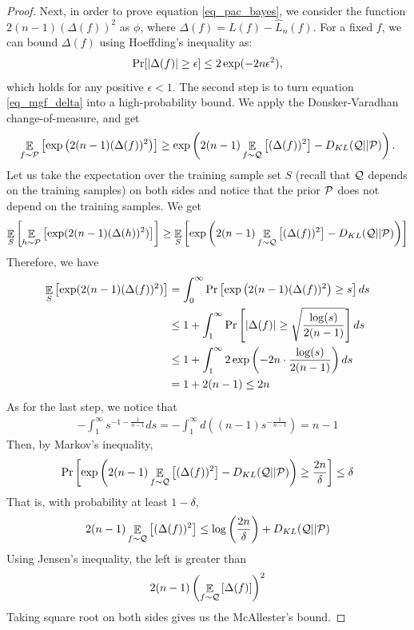 \begin{proof}
Next, in order to prove equation \eqref{eq_pac_bayes}, we consider the function $2(n-1) (\Delta(f))^2$ as $\phi$, where $\Delta(f) = L(f) - \hat L_n(f)$.
For a fixed $f$, we can bound $\Delta(f)$ using Hoeffding's inequality as:
\begin{align}
    \Pr[\left\lvert\Delta(f)\right\rvert \ge \epsilon] \le 2\exp(-2n \epsilon^2), \label{eq_mgf_delta}
\end{align}
which holds for any positive $\epsilon < 1$.
The second step is to turn equation \eqref{eq_mgf_delta} into a high-probability bound.
We apply the Donsker-Varadhan change-of-measure, and get
\begin{align*}
    \mathop{\mathbb{E}}_{f\sim\mathcal{P}}\left[ \exp\left(2(n-1) (\Delta(f))^2\right) \right]
    \ge \exp\left( 2(n-1) \mathop{\mathbb{E}}_{f\sim\mathcal{Q}}\left[ (\Delta(f))^2 \right] - D_{KL}(\mathcal{Q} || \mathcal{P})\right).
\end{align*}
Let us take the expectation over the training sample set $S$ (recall that $\mathcal{Q}$ depends on the training samples) on both sides and notice that the prior $\mathcal{P}$ does not depend on the training samples.
We get
\begin{align*}
    \mathop{\mathbb{E}}_{S}\left[ \mathop{\mathbb{E}}_{h\sim\mathcal{P}}\left[ \exp(2(n-1) (\Delta(h))^2) \right] \right]
    \ge \mathop{\mathbb{E}}_{S}\left[ \exp\left( 2(n-1) \mathop{\mathbb{E}}_{f\sim\mathcal{Q}}\left[ (\Delta(f))^2 \right] - D_{KL}(\mathcal{Q} || \mathcal{P})\right) \right]
\end{align*}
Therefore, we have
\begin{align*}
    \mathop{\mathbb{E}}_{S}\left[ \exp(2(n-1) (\Delta(f))^2) \right]
    &= \int_{0}^{\infty} \Pr\left[\exp\left(2(n-1) (\Delta(f))^2\right) \ge s\right] ds \\
    &\le 1 + \int_1^{\infty} \Pr\left[{\left| {\Delta(f)} \right|} \ge \sqrt{\frac {\log(s)} {2(n-1)}}\right] ds \\
    &\le 1 + \int_1^{\infty} 2\exp\left(-2n \cdot \frac {\log(s)} {2(n-1)}\right)  ds \\
    & = 1 + 2(n-1) \le 2n
\end{align*}
As for the last step, we notice that
\begin{align*}
    -\int_1^{\infty} s^{-1 - \frac 1 {n-1}} ds
    = -\int_1^{\infty}  d \left( (n-1) s^{-\frac 1 {n-1}} \right) = n-1
\end{align*}
Then, by Markov's inequality,
\begin{align*}
    \Pr\left[\exp\left(2(n-1) \mathop{\mathbb{E}}_{f\sim\mathcal{Q}}\left[ (\Delta(f))^2 \right] - D_{KL}(\mathcal{Q} || \mathcal{P})\right) \ge \frac {2n} {\delta}\right]
    \le \delta
\end{align*}
That is, with probability at least $1 - \delta$,
\[ 2(n-1) \mathop{\mathbb{E}}_{f\sim\mathcal{Q}}\left[ (\Delta(f))^2 \right] \le \log\left(\frac {2n} {\delta}\right) + D_{KL}(\mathcal{Q} || \mathcal{P}) \]
Using Jensen's inequality, the left is greater than \[2(n-1)\left(\mathop{\mathbb{E}}_{f\sim\mathcal{Q}}\left[ \Delta(f) \right]\right)^2 \]
Taking square root on both sides gives us the McAllester's bound.
\end{proof}

